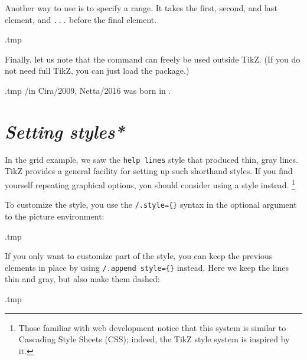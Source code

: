 Another way to use  is to specify a range.
It takes the first, second, and last element, and \verb|...| before the final element.
%
\begin{VerbatimOut}{\jobname.tmp}
\centering
{}
\end{VerbatimOut}
\ShowExampleBelow[2]

Finally, let us note that the  command can freely be used outside TikZ.
(If you do not need full TikZ, you can just load the  package.)
%
\begin{VerbatimOut}{\jobname.tmp}
\foreach \dog/\yr in {Cira/2009, Netta/2016}
  {\dog{} was born in \yr{}.\\}
\end{VerbatimOut}
\ShowExample


%
%
\section{\emph{Setting styles*}}\label{sec:tikz styles}

In the grid example, we saw the \verb|help lines| style that produced thin, gray lines.
TikZ provides a general facility for setting up such shorthand styles.
If you find yourself repeating graphical options,
you should consider using a style instead.%
\footnote{Those familiar with web development notice that this system is similar to
Cascading Style Sheets (CSS); indeed, the TikZ style system is inspired by it.}

To customize the style,
you use the \verb|/.style={}| syntax in the optional argument to the picture environment:
%
\begin{VerbatimOut}{\jobname.tmp}
\centering
{}
\end{VerbatimOut}
\ShowExampleBelow[2]

If you only want to customize part of the style,
you can keep the previous elements in place by using \verb|/.append style={}| instead.
Here we keep the lines thin and gray, but also make them dashed:
%
\begin{VerbatimOut}{\jobname.tmp}
\centering
{}
\end{VerbatimOut}
\ShowExampleBelow[2]

